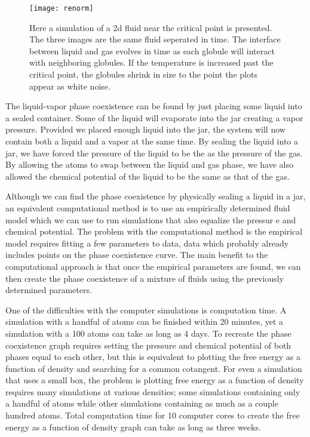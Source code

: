 \begin{figure}[h]
\vspace*{-0mm}
\hspace*{-6mm}
	\centering
	\texttt{[image: renorm]}
	\caption{
	\scriptsize
	Here a simulation of a 2d fluid near the critical point is presented. The three images are the same fluid seperated in time. The interface between liquid and gas evolves in time as each globule will interact with neighboring globules. If the temperature is increased past the critical point, the globules shrink in size to the point the plots appear as white noise.}
	\label{fig:renorm}
\end{figure}

The liquid-vapor phase coexistence can be found by just placing some liquid into a sealed container. Some of the liquid will evaporate into the jar creating a vapor pressure. Provided we placed enough liquid into the jar, the system will now contain both a liquid and a vapor at the same time. By sealing the liquid into a jar, we have forced the pressure of the liquid to be the as the pressure of the gas. By allowing the atoms to swap between the liquid and gas phase, we have also allowed the chemical potential of the liquid to be the same as that of the gas.

Although we can find the phase coexistence by physically sealing a liquid in a jar, an equivalent computational method is to use an empirically determined fluid model which we can use to run simulations that also equalize the pressur
e and chemical potential. The problem with the computational method is the empirical model requires fitting a few parameters to data, data which probably already includes points on the phase coexistence curve. The main benefit to the computational approach is that once the empirical parameters are found, we can then create the phase coexistence of a mixture of fluids using the previously determined parameters.

One of the difficulties with the computer simulations is computation time. A simulation with a handful of atoms can be finished within 20 minutes, yet a simulation with a 100 atoms can take as long as 4 days. To recreate the phase coexistence graph requires setting the pressure and chemical potential of both phases equal to each other, but this is equivalent to plotting the free energy as a function of density and searching for a common cotangent. For even a simulation that uses a small box, the problem is plotting free energy as a function of density requires many simulations at various densities; some simulations containing only a handful of atoms while other simulations containing as much as a couple hundred atoms. Total computation time for 10 computer cores to create the free energy as a function of density graph can take as long as three weeks.

